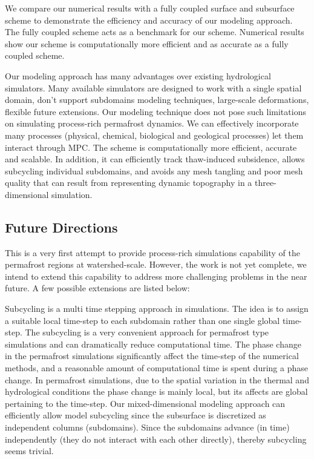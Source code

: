 \documentclass[review]{elsarticle}
\begin{document}
We compare our numerical results with a fully coupled surface and subsurface scheme to demonstrate the efficiency and accuracy of our modeling approach. The fully coupled scheme acts as a benchmark for our scheme. Numerical results show our scheme is computationally more efficient and as accurate as a fully coupled scheme. 

Our modeling approach has many advantages over existing hydrological simulators. Many available simulators are designed to work with a single spatial domain, don't support subdomains modeling techniques, large-scale deformations, flexible future extensions. Our modeling technique does not pose such limitations on simulating process-rich permafrost dynamics. We can effectively incorporate many processes (physical, chemical, biological and geological processes) let them interact through MPC.  The scheme is computationally more efficient, accurate and scalable. In addition, it can efficiently track thaw-induced subsidence, allows subcycling individual subdomains, and avoids any mesh tangling and poor mesh quality that can result from representing dynamic topography in a three-dimensional simulation.
 

 
\subsection{Future Directions}
This is a very first attempt to provide process-rich simulations capability of the permafrost regions at watershed-scale. However, the work is not yet complete, we intend to  extend this capability to address more challenging problems in the near future. A few possible extensions are listed below:

Subcycling is a multi time stepping approach in simulations. The idea is to assign a suitable local time-step to each subdomain rather than one single global time-step. The subcycling is a very convenient approach for permafrost type simulations and can dramatically reduce computational time. The phase change in the permafrost simulations significantly affect the time-step of the numerical methods, and a reasonable amount of computational time is spent during a phase change. In permafrost simulations, due to the spatial variation in the thermal and hydrological conditions the phase change is mainly local, but its affects are global pertaining to the time-step. Our mixed-dimensional modeling approach can efficiently allow model subcycling since the subsurface is discretized as independent columns (subdomains). Since the subdomains advance (in time) independently (they do not interact with each other directly), thereby subcycling seems trivial. 
\end{document}
